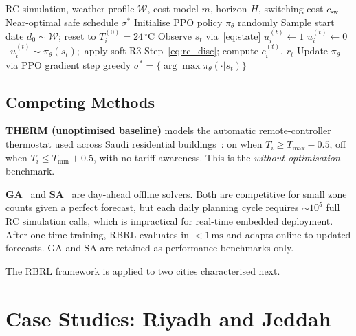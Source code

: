 \documentclass[12pt,a4paper]{article}
\let\oldsection\section
\renewcommand{\section}[1]{\FloatBarrier\oldsection{#1}}
\let\oldsubsection\subsection
\renewcommand{\subsection}[1]{\FloatBarrier\oldsubsection{#1}}
\newcommand{\sched}{\sigma}
\newcommand{\Tmin}{T_{\min}}
\newcommand{\Tmax}{T_{\max}}
\newcommand{\csw}{c_{\mathrm{sw}}}
\begin{document}
\begin{algorithm}[H]
\caption{RBRL: Training and Schedule Extraction}
\label{alg:rbrl}
\begin{algorithmic}[1]
\Require RC simulation, weather profile $\mathcal{W}$, cost model $m$,
  horizon $H$, switching cost $\csw$
\Ensure Near-optimal safe schedule $\sched^*$
\State Initialise PPO policy $\pi_\theta$ randomly
  \State Sample start date $d_0\sim\mathcal{W}$;
         reset to $T_i^{(0)}=24\,^\circ$C
    \State Observe $s_t$ via~\eqref{eq:state}
      \If{$T_i^{(t)}\ge\Tmax-\epsilon_{\mathrm{g}}$}
        $u_i^{(t)}\leftarrow1$ 
      \ElsIf{$T_i^{(t)}\le\Tmin+\epsilon_{\mathrm{g}}$}
        $u_i^{(t)}\leftarrow0$ 
      \Else\ $u_i^{(t)}\sim\pi_\theta(s_t)$;\, apply soft R3
      \EndIf
    \EndFor
    \State Step~\eqref{eq:rc_disc}; compute $c_i^{(t)}$, $r_t$
  \EndFor
  \State Update $\pi_\theta$ via PPO gradient step
\EndFor
\State\Return greedy $\sched^*=\bigl\{\arg\max\pi_\theta(\cdot|s_t)\bigr\}$
\end{algorithmic}
\end{algorithm}

\subsection{Competing Methods}
\label{subsec:compete}

\textbf{THERM (unoptimised baseline)} models the automatic
remote-controller thermostat used across Saudi residential
buildings~\cite{Alotaibi2024}: on when $T_i\ge\Tmax-0.5$, off when
$T_i\le\Tmin+0.5$, with no tariff awareness.
This is the \emph{without-optimisation} benchmark.

\textbf{GA}~\cite{ElMakroum2023} and \textbf{SA}~\cite{Bandarra2025}
are day-ahead offline solvers.
Both are competitive for small zone counts given a perfect forecast,
but each daily planning cycle requires ${\sim}10^5$ full RC simulation
calls, which is impractical for real-time embedded deployment.
After one-time training, RBRL evaluates in ${<}1\,\text{ms}$ and adapts
online to updated forecasts.
GA and SA are retained as performance benchmarks only.

The RBRL framework is applied to two cities characterised next.

\section{Case Studies: Riyadh and Jeddah}
\label{sec:casestudy}
\end{document}
